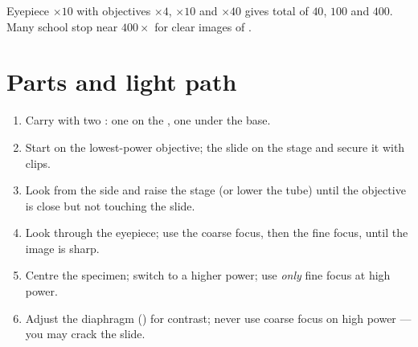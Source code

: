 \begin{example}\label{ex:g7:microscope:powers}
Eyepiece $\times 10$ with objectives $\times 4$, $\times 10$ and
$\times 40$ gives total  of $40$, $100$ and $400$. Many
school  stop near $400\times$ for clear images of .
\end{example}

\section{Parts and light path}

\begin{method}\label{met:g7:microscope:use}
\begin{enumerate}
  \item Carry with two : one on the , one under the base.
  \item Start on the lowest-power objective;  the slide on the stage
        and secure it with clips.
  \item Look from the side and raise the stage (or lower the tube) until
        the objective is close but not touching the slide.
  \item Look through the eyepiece; use the coarse focus, then the fine
        focus, until the image is sharp.
  \item Centre the specimen; switch to a higher power; use \emph{only}
        fine focus at high power.
  \item Adjust the diaphragm () for contrast; never use coarse focus
        on high power --- you may crack the slide.
\end{enumerate}
\end{method}

